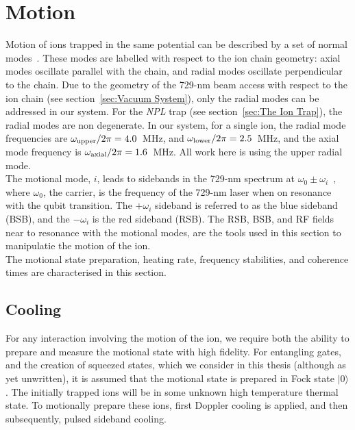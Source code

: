 \section{Motion}
\label{sec:Motion}

    Motion of ions trapped in the same potential can be described by a set of normal modes~\cite{james_quantum_1998}. These modes are labelled with respect to the ion chain geometry: axial modes oscillate parallel with the chain, and radial modes oscillate perpendicular to the chain. Due to the geometry of the 729-nm beam access with respect to the ion chain (see section~\ref{sec:Vacuum System}), only the radial modes can be addressed in our system. For the \emph{NPL} trap (see section~\ref{sec:The Ion Trap}), the radial modes are non degenerate. In our system, for a single ion, the radial mode frequencies are $\omega_{\rm upper}/2\pi = 4.0$~{MHz}, and $\omega_{\rm lower}/2\pi = 2.5$~\unit{MHz}, and the axial mode frequency is $\omega_{\rm axial}/2\pi = 1.6$~{MHz}. All work here is using the upper radial mode. \\
    The motional mode, $i$, leads to sidebands in the 729-nm spectrum at $\omega_0 \pm \omega_{i}$~\cite{ozeri_tutorial_2011}, where $\omega_0$, the carrier, is the frequency of the 729-nm laser when on resonance with the qubit transition. The $+\omega_i$ sideband is referred to as the blue sideband (BSB), and the $-\omega_i$ is the red sideband (RSB).
    The RSB, BSB, and RF fields near to resonance with the motional modes, are the tools used in this section to manipulatie the motion of the ion.\\
    The motional state preparation, heating rate, frequency stabilities, and coherence times are characterised in this section.

\subsection{Cooling}
\label{sec:Cooling}

    For any interaction involving the motion of the ion, we require both the
    ability to prepare and measure the motional state with high fidelity. For
    entangling gates, and the creation of squeezed states, which we 
    consider in this thesis (although as yet unwritten), it is assumed that the motional state is prepared in Fock state $|0\rangle$. The initially trapped ions will
    be in some unknown high temperature thermal state. To motionally prepare these ions, first Doppler cooling is applied, and then
    subsequently, pulsed sideband cooling. \\

